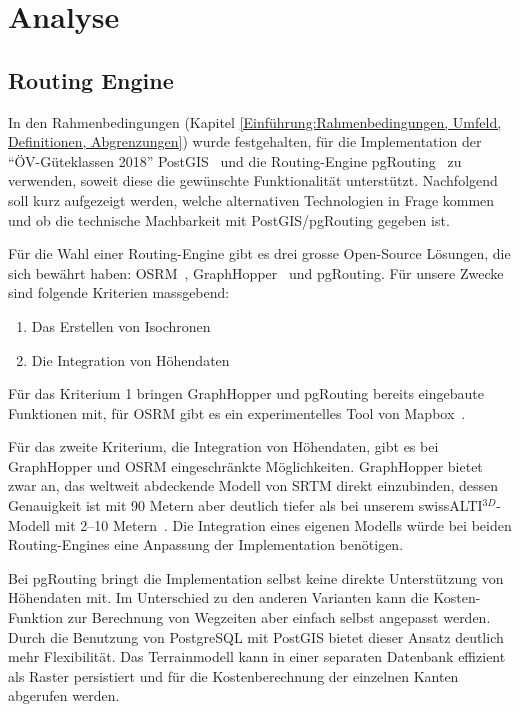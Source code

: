 
\section{Analyse}
\label{Analyse}

\subsection{Routing Engine}
\label{Analyse:Routing Engine}

In den Rahmenbedingungen (Kapitel \ref{Einführung:Rahmenbedingungen, Umfeld, Definitionen, Abgrenzungen}) wurde festgehalten, für die Implementation der "`\acs{ÖV}-Güteklassen 2018"' PostGIS~\cite{postgis} und die Routing-Engine pgRouting~\cite{pgRouting} zu verwenden, soweit diese die gewünschte Funktionalität unterstützt.
Nachfolgend soll kurz aufgezeigt werden, welche alternativen Technologien in Frage kommen und ob die technische Machbarkeit mit PostGIS/pgRouting gegeben ist.

Für die Wahl einer Routing-Engine gibt es drei grosse Open-Source Lösungen, die sich bewährt haben: OSRM~\cite{osrm}, GraphHopper~\cite{graphhopper} und pgRouting.
Für unsere Zwecke sind folgende Kriterien massgebend:

\begin{enumerate}
    \item Das Erstellen von Isochronen
    \item Die Integration von Höhendaten
\end{enumerate}

Für das Kriterium 1 bringen GraphHopper und pgRouting bereits eingebaute Funktionen mit, für OSRM gibt es ein experimentelles Tool von Mapbox~\cite{mapbox_osrm_isochrone}.

Für das zweite Kriterium, die Integration von Höhendaten, gibt es bei GraphHopper und OSRM eingeschränkte Möglichkeiten. GraphHopper bietet zwar an, das weltweit abdeckende Modell von \ac{SRTM} direkt einzubinden, dessen Genauigkeit ist mit 90 Metern aber deutlich tiefer als bei unserem swissALTI$^{3D}$-Modell mit 2--10 Metern~\cite{swissalti3d_swisstopo}. Die Integration eines eigenen Modells würde bei beiden Routing-Engines eine Anpassung der Implementation benötigen.

Bei pgRouting bringt die Implementation selbst keine direkte Unterstützung von Höhendaten mit.
Im Unterschied zu den anderen Varianten kann die Kosten-Funktion zur Berechnung von Wegzeiten aber einfach selbst angepasst werden.
Durch die Benutzung von PostgreSQL mit PostGIS bietet dieser Ansatz deutlich mehr Flexibilität.
Das Terrainmodell kann in einer separaten Datenbank effizient als Raster persistiert und für die Kostenberechnung der einzelnen Kanten abgerufen werden.


